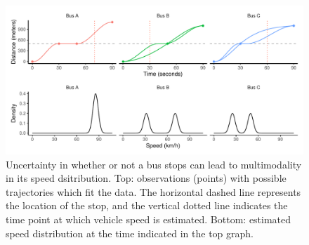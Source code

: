 \begin{knitrout}\small
{}\color{fgcolor}\begin{figure}

{\centering \includegraphics[width=\textwidth]{figure/vobs_multimode-1} 

}

\caption[Demonstration of multimodality in vehicle state]{Uncertainty in whether or not a bus stops can lead to multimodality in its speed dsitribution. Top: observations (points) with possible trajectories which fit the data. The horizontal dashed line represents the location of the stop, and the vertical dotted line indicates the time point at which vehicle speed is estimated. Bottom: estimated speed distribution at the time indicated in the top graph.}\label{fig:vobs_multimode}
\end{figure}


\end{knitrout}


